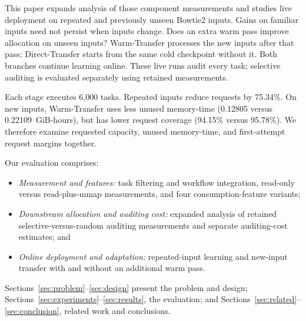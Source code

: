 This paper expands analysis of those component measurements and studies
live deployment on repeated and previously unseen Bowtie2 inputs. Gains
on familiar inputs need not persist when inputs change. Does an extra
warm pass improve allocation on unseen inputs?
Warm-Transfer processes the new inputs after that pass; Direct-Transfer
starts from the same cold checkpoint without it. Both branches continue
learning online. These live runs audit every task; selective auditing is
evaluated separately using retained measurements.

Each stage executes 6,000 tasks. Repeated inputs reduce requests by
75.34\%. On new inputs, Warm-Transfer uses less unused memory-time
(0.12805 versus 0.22109~GiB-hours), but has lower request coverage
(94.15\% versus 95.78\%). We therefore examine requested capacity,
unused memory-time, and first-attempt request margins together.

Our evaluation comprises:
\begin{itemize}
\item \emph{Measurement and features:} task filtering and workflow
integration, read-only versus read-plus-mmap measurements, and four
consumption-feature variants;
\item \emph{Downstream allocation and auditing cost:} expanded analysis
of retained selective-versus-random auditing measurements and separate
auditing-cost estimates; and
\item \emph{Online deployment and adaptation:} repeated-input learning
and new-input transfer with and without an additional warm pass.
\end{itemize}
Sections~\ref{sec:problem}--\ref{sec:design} present the problem and design;
Sections~\ref{sec:experiments}--\ref{sec:results}, the evaluation; and
Sections~\ref{sec:related}--\ref{sec:conclusion}, related work and conclusions.
